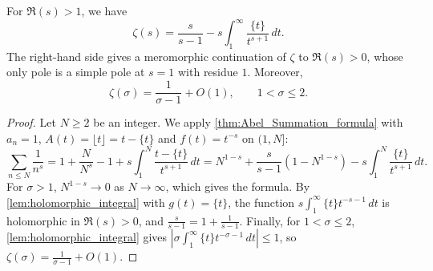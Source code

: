 \begin{proposition}\label{prop:zeta_continuation}
    For $\Re(s) >1$, we have
    \begin{equation*}
        \zeta(s) = \frac{s}{s-1} - s\int_1^\infty\frac{\{t\}}{t^{s+1}}\,dt.
    \end{equation*}
    The right-hand side gives a meromorphic continuation of $\zeta$ to $\Re(s)>0$, whose only pole is a simple pole at $s=1$ with residue $1$. Moreover,
    \begin{equation*}
        \zeta(\sigma) = \frac{1}{\sigma-1} + O(1), \qquad 1<\sigma\le2.
    \end{equation*}
\end{proposition}
\begin{proof}
    Let $N \ge 2$ be an integer. We apply \cref{thm:Abel_Summation_formula} with $a_n = 1$, $A(t)=\lfloor t\rfloor = t - \{t\}$ and $f(t) = t^{-s}$ on $(1,N]$:
    \begin{equation*}
        \sum_{n\le N}\frac 1{n^s} = 1 + \frac{N}{N^s} - 1 + s\int_1^N \frac{t-\{t\}}{t^{s+1}}\,dt = N^{1-s} + \frac{s}{s-1}\left(1-N^{1-s}\right) - s\int_1^N\frac{\{t\}}{t^{s+1}}\,dt.
    \end{equation*}
    For $\sigma>1$, $N^{1-s}\to0$ as $N\to\infty$, which gives the formula. By \cref{lem:holomorphic_integral} with $g(t) = \{t\}$, the function $s\int_1^\infty \{t\}t^{-s-1}\,dt$ is holomorphic in $\Re(s)>0$, and $\frac{s}{s-1} = 1 + \frac{1}{s-1}$. Finally, for $1<\sigma\le2$, \cref{lem:holomorphic_integral} gives $\left\lvert\sigma\int_1^\infty\{t\}t^{-\sigma-1}\,dt\right\rvert\le 1$, so $\zeta(\sigma) = \frac{1}{\sigma-1} + O(1)$.
\end{proof}
